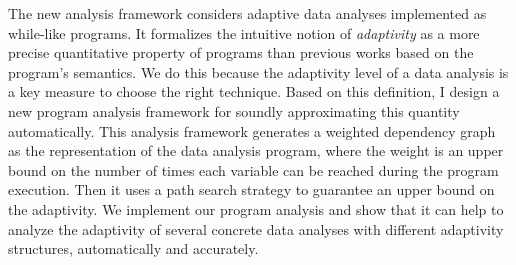 The new analysis framework considers adaptive data analyses implemented as while-like programs.
It formalizes the intuitive notion of \emph{adaptivity} as a
more precise quantitative property of programs than previous works based on the program's semantics.
We do this because the adaptivity level of a data analysis is a key measure to choose the right technique. 
Based on this definition, I design a new program analysis framework for soundly approximating this quantity automatically.
This analysis framework generates a weighted dependency graph as the representation of the data analysis program,
where the weight is an upper bound on the number of times each variable can be reached during the program execution.
Then it uses a path search strategy to guarantee an upper bound on the adaptivity. 
We implement our program analysis and show that it can help to analyze the adaptivity of several
concrete data analyses with different adaptivity structures, automatically and accurately.


